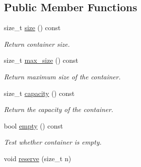 \subsection*{Public Member Functions}
\begin{DoxyCompactItemize}
\item 
\hypertarget{classmerlin_1_1set_ac0742e3c7efa8729e1665dc4d0e27784}{}size\+\_\+t \hyperlink{classmerlin_1_1set_ac0742e3c7efa8729e1665dc4d0e27784}{size} () const \label{classmerlin_1_1set_ac0742e3c7efa8729e1665dc4d0e27784}

\begin{DoxyCompactList}\small\item\em Return container size. \end{DoxyCompactList}\item 
\hypertarget{classmerlin_1_1set_ad67b073f6e622b4172d45b94bdf8a84a}{}size\+\_\+t \hyperlink{classmerlin_1_1set_ad67b073f6e622b4172d45b94bdf8a84a}{max\+\_\+size} () const \label{classmerlin_1_1set_ad67b073f6e622b4172d45b94bdf8a84a}

\begin{DoxyCompactList}\small\item\em Return maximum size of the container. \end{DoxyCompactList}\item 
\hypertarget{classmerlin_1_1set_ad3f6a7acc4c9bf242f7f7232e50327bc}{}size\+\_\+t \hyperlink{classmerlin_1_1set_ad3f6a7acc4c9bf242f7f7232e50327bc}{capacity} () const \label{classmerlin_1_1set_ad3f6a7acc4c9bf242f7f7232e50327bc}

\begin{DoxyCompactList}\small\item\em Return the capacity of the container. \end{DoxyCompactList}\item 
\hypertarget{classmerlin_1_1set_a8b606658f0bd7e5b75678110916a3e4a}{}bool \hyperlink{classmerlin_1_1set_a8b606658f0bd7e5b75678110916a3e4a}{empty} () const \label{classmerlin_1_1set_a8b606658f0bd7e5b75678110916a3e4a}

\begin{DoxyCompactList}\small\item\em Test whether container is empty. \end{DoxyCompactList}\item 
\hypertarget{classmerlin_1_1set_a320b79b019b9eb53317443c44c92d5a5}{}void \hyperlink{classmerlin_1_1set_a320b79b019b9eb53317443c44c92d5a5}{reserve} (size\+\_\+t n)\label{classmerlin_1_1set_a320b79b019b9eb53317443c44c92d5a5}


\end{DoxyCompactItemize}
